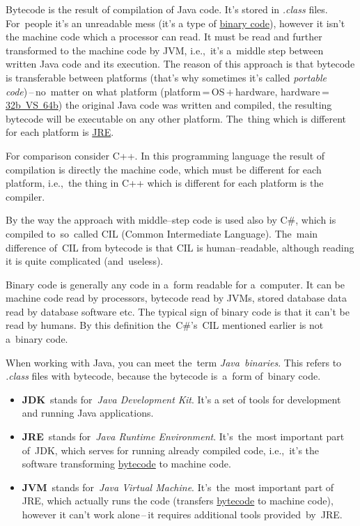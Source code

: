 \label{bytecode}
Bytecode is the result of compilation of Java code. It's stored in \textit{.class} files. For~people it's an unreadable mess (it's a type of \hyperref[bytecodebinarycode]{binary code}), however it isn't the machine code which a processor can read. It must be read and further transformed to the machine code by JVM, i.e.,~it's a~middle step between written Java code and its execution. The reason of this approach is that bytecode is transferable between platforms (that's why sometimes it's called \textit{portable code})\,--\,no~matter on what platform (platform\,=\,OS\,+\,hardware, hardware\,=\,\hyperref[32bvs64b]{32b~VS~64b}) the original Java code was written and compiled, the resulting bytecode will be executable on any other platform. The~thing which is different for each platform is \hyperref[jdkjrejvm]{JRE}.

For comparison consider C++. In this programming language the result of compilation is directly the machine code, which must be different for each platform, i.e.,~the thing in C++ which is different for each platform is the compiler.

By the way the approach with middle--step code is used also by C\#, which is compiled to~so~called CIL (Common Intermediate Language). The~main difference of~CIL from bytecode is that CIL is human--readable, although reading it is quite complicated (and~useless).

\label{bytecodebinarycode}
Binary code is generally any code in a~form readable for a~computer. It can be machine code read by processors, bytecode read by JVMs, stored database data read by database software etc. The typical sign of binary code is that it can't be read by humans. By this definition the~C\#'s~CIL mentioned earlier is not a~binary code.

When working with Java, you can meet the~term \textit{Java~binaries}. This refers to \textit{.class} files with bytecode, because the bytecode is~a~form of~binary code.

\label{jdkjrejvm}
\begin{itemize}
    \item \textbf{JDK}~stands for~\textit{Java Development Kit}. It's a set of tools for development and running Java applications.
    \item \textbf{JRE}~stands for~\textit{Java Runtime Environment}. It's~the~most important part of~JDK, which serves for running already compiled code, i.e.,~it's the software transforming \hyperref[bytecode]{bytecode} to machine code.
    \item \textbf{JVM}~stands for~\textit{Java Virtual Machine}. It's~the~most important part of JRE, which actually runs the code (transfers \hyperref[bytecode]{bytecode} to machine code), however it can't work alone\,--\,it requires additional tools provided~by~JRE.
\end{itemize}

